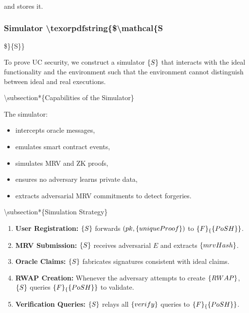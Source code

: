 \documentclass{article}
\begin{document}
and stores it.

\subsubsection{Simulator {\textbackslash}texorpdfstring\{\${\textbackslash}mathcal\{S}

\$\}\{S\}\}

To prove UC security, we construct a simulator $\mathcal\{S\}$ that interacts with
the ideal functionality and the environment such that the environment cannot
distinguish between ideal and real executions.

{\textbackslash}subsection*\{Capabilities of the Simulator\}

The simulator:

\begin{itemize}
\item intercepts oracle messages,
\item emulates smart contract events,
\item simulates MRV and ZK proofs,
\item ensures no adversary learns private data,
\item extracts adversarial MRV commitments to detect forgeries.
\end{itemize}

{\textbackslash}subsection*\{Simulation Strategy\}

\begin{enumerate}
\item \textbf{User Registration:}\newline
$\mathcal\{S\}$ forwards $(pk, \mathsf\{uniqueProof\})$ to $\mathcal\{F\}_\{\textsf\{PoSH\}\}$.
\item \textbf{MRV Submission:}\newline
$\mathcal\{S\}$ receives adversarial $E$ and extracts $\mathsf\{mrvHash\}$.
\item \textbf{Oracle Claims:}\newline
$\mathcal\{S\}$ fabricates signatures consistent with ideal claims.
\item \textbf{RWAP Creation:}\newline
Whenever the adversary attempts to create $\mathsf\{RWAP\}$,\newline
$\mathcal\{S\}$ queries $\mathcal\{F\}_\{\textsf\{PoSH\}\}$ to validate.
\item \textbf{Verification Queries:}\newline
$\mathcal\{S\}$ relays all $\textsf\{verify\}$ queries to $\mathcal\{F\}_\{\textsf\{PoSH\}\}$.
\end{enumerate}
\end{document}
